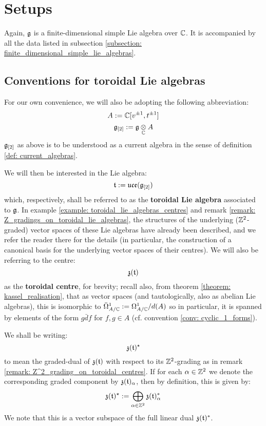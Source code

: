 \section{Setups}
    Again, $\mathfrak{g}$ is a finite-dimensional simple Lie algebra over $\mathbb{C}$. It is accompanied by all the data listed in subsection \ref{subsection: finite_dimensional_simple_lie_algebras}. 

    \subsection{Conventions for toroidal Lie algebras} \label{subsection: toroidal_lie_algebra_conventions}
        For our own convenience, we will also be adopting the following abbreviation:
            $$A := \mathbb{C}[v^{\pm 1}, t^{\pm 1}]$$
            $$\g_{[2]} := \g \tensor_{\bbC} A$$
        $\mathfrak{g}_{[2]}$ as above is to be understood as a current algebra in the sense of definition \ref{def: current_algebras}.
    
        We will then be interested in the Lie algebra:
            $$\mathfrak{t} := \mathfrak{uce}(\mathfrak{g}_{[2]})$$
        which, respectively, shall be referred to as the \textbf{toroidal Lie algebra} associated to $\mathfrak{g}$. In example \ref{example: toroidal_lie_algebras_centres} and remark \ref{remark: Z_gradings_on_toroidal_lie_algebras}, the structures of the underlying ($\mathbb{Z}^2$-graded) vector spaces of these Lie algebras have already been described, and we refer the reader there for the details (in particular, the construction of a canonical basis for the underlying vector spaces of their centres). We will also be referring to the centre:
            $$\mathfrak{z}(\mathfrak{t})$$
        as the \textbf{toroidal centre}, for brevity; recall also, from theorem \ref{theorem: kassel_realisation}, that as vector spaces (and tautologically, also as abelian Lie algebras), this is isomorphic to $\bar{\Omega}^1_{A/\mathbb{C}} := \Omega^1_{A/\mathbb{C}}/d(A)$ so in particular, it is spanned by elements of the form $g \bar{d}f$ for $f, g \in A$ (cf. convention \ref{conv: cyclic_1_forms}).

        We shall be writing:
            $$\mathfrak{z}(\mathfrak{t})^{\star}$$
        to mean the graded-dual of $\mathfrak{z}(\mathfrak{t})$ with respect to its $\mathbb{Z}^2$-grading as in remark \ref{remark: Z^2_grading_on_toroidal_centres}. If for each $\alpha \in \mathbb{Z}^2$ we denote the corresponding graded component by $\mathfrak{z}(\mathfrak{t})_{\alpha}$, then by definition, this is given by:
            $$\mathfrak{z}(\mathfrak{t})^{\star} := \bigoplus_{\alpha \in \mathbb{Z}^2} \mathfrak{z}(\mathfrak{t})_{\alpha}^*$$
        We note that this is a vector subspace of the full linear dual $\mathfrak{z}(\mathfrak{t})^*$.
    
